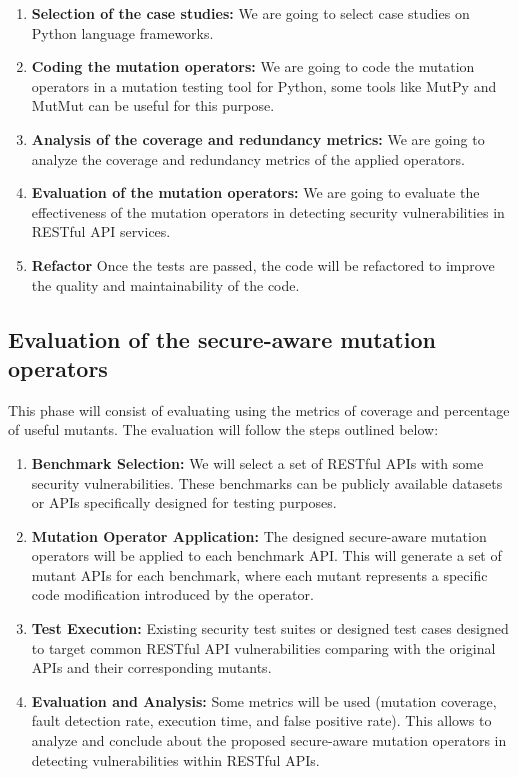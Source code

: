 \begin{enumerate}
  \item \textbf{Selection of the case studies:} We are going to select case studies on Python language frameworks.
  \item \textbf{Coding the mutation operators:} We are going to code the mutation operators in a mutation testing tool for Python, some tools like MutPy and MutMut can be useful for this purpose.
  \item \textbf{Analysis of the coverage and redundancy metrics:} We are going to analyze the coverage and redundancy metrics of the applied operators.
  \item \textbf{Evaluation of the mutation operators:} We are going to evaluate the effectiveness of the mutation operators in detecting security vulnerabilities in RESTful API services.
  \item \textbf{Refactor} Once the tests are passed, the code will be refactored to improve the quality and maintainability of the code.
\end{enumerate}

\subsection{Evaluation of the secure-aware mutation operators}

This phase will consist of evaluating using the metrics of coverage and percentage of useful mutants. The evaluation will follow the steps outlined below:

\begin{enumerate}
  \item \textbf{Benchmark Selection:} We will select a set of RESTful APIs with some security vulnerabilities. These benchmarks can be publicly available datasets or APIs specifically designed for testing purposes.
  \item \textbf{Mutation Operator Application:} The designed secure-aware mutation operators will be applied to each benchmark API. This will generate a set of mutant APIs for each benchmark, where each mutant represents a specific code modification introduced by the operator.
  \item \textbf{Test Execution:} Existing security test suites or designed test cases designed to target common RESTful API vulnerabilities comparing with the original APIs and their corresponding mutants.
  \item \textbf{Evaluation and Analysis:} Some metrics will be used (mutation coverage, fault detection rate, execution time, and false positive rate). This allows to analyze and conclude about the proposed secure-aware mutation operators in detecting vulnerabilities within RESTful APIs.
\end{enumerate}
